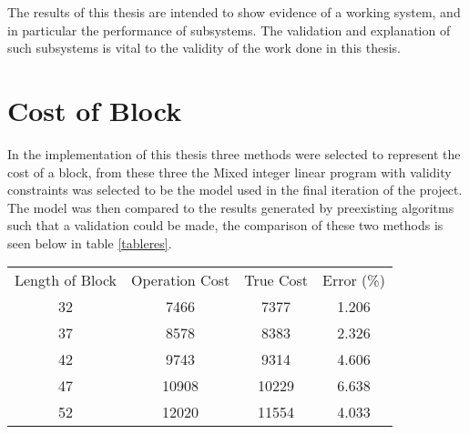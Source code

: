 
The results of this thesis are intended to show evidence of a working system, and in particular the performance of subsystems. The validation and explanation of such subsystems is vital to the validity of the work done in this thesis. 
\section{Cost of Block}
In the implementation of this thesis three methods were selected to represent the cost of a block, from these three the Mixed integer linear program with validity constraints was selected to be the model used in the final iteration of the project. The model was then compared to the results generated by preexisting algoritms\cite{A*Search} such that a validation could be made, the comparison of these two methods is seen below in table \ref{tableres}. 

\begin{center}
\label{tableres}
 \begin{tabular}{|c| c| c|c|} 
 \hline
 Length of Block & Operation Cost& True Cost & Error (\%)\\ 
 32 & 7466 & 7377 & 1.206\\ 
 \hline
 37 & 8578 & 8383 & 2.326 \\
 \hline
 42 & 9743 & 9314 & 4.606 \\
 \hline
 47 & 10908 & 10229 & 6.638 \\
 \hline
 52 & 12020 & 11554 & 4.033\\ 
 \hline
\end{tabular}
\end{center}



